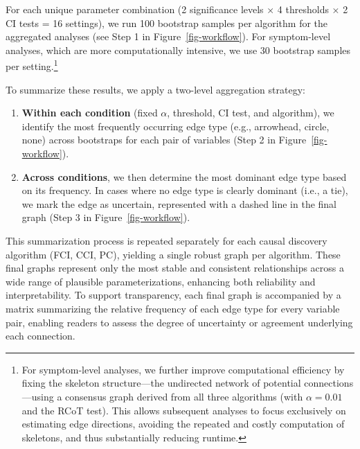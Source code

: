 \documentclass[
]{article}
\providecommand{\tightlist}{%
  \setlength{\itemsep}{0pt}\setlength{\parskip}{0pt}}\usepackage{longtable,booktabs,array}
\begin{document}
For each unique parameter combination (2 significance levels × 4
thresholds × 2 CI tests = 16 settings), we run 100 bootstrap samples per
algorithm for the aggregated analyses (see Step 1 in
Figure~\ref{fig-workflow}). For symptom-level analyses, which are more
computationally intensive, we use 30 bootstrap samples per
setting.\footnote{For symptom-level analyses, we further improve
  computational efficiency by fixing the skeleton structure---the
  undirected network of potential connections---using a consensus graph
  derived from all three algorithms (with \(\alpha = 0.01\) and the RCoT
  test). This allows subsequent analyses to focus exclusively on
  estimating edge directions, avoiding the repeated and costly
  computation of skeletons, and thus substantially reducing runtime.}

To summarize these results, we apply a two-level aggregation strategy:

\begin{enumerate}
\def\labelenumi{\arabic{enumi}.}
\tightlist
\item
  \textbf{Within each condition} (fixed \(\alpha\), threshold, CI test,
  and algorithm), we identify the most frequently occurring edge type
  (e.g., arrowhead, circle, none) across bootstraps for each pair of
  variables (Step 2 in Figure~\ref{fig-workflow}).
\item
  \textbf{Across conditions}, we then determine the most dominant edge
  type based on its frequency. In cases where no edge type is clearly
  dominant (i.e., a tie), we mark the edge as uncertain, represented
  with a dashed line in the final graph (Step 3 in
  Figure~\ref{fig-workflow}).
\end{enumerate}

This summarization process is repeated separately for each causal
discovery algorithm (FCI, CCI, PC), yielding a single robust graph per
algorithm. These final graphs represent only the most stable and
consistent relationships across a wide range of plausible
parameterizations, enhancing both reliability and interpretability. To
support transparency, each final graph is accompanied by a matrix
summarizing the relative frequency of each edge type for every variable
pair, enabling readers to assess the degree of uncertainty or agreement
underlying each connection.
\end{document}
